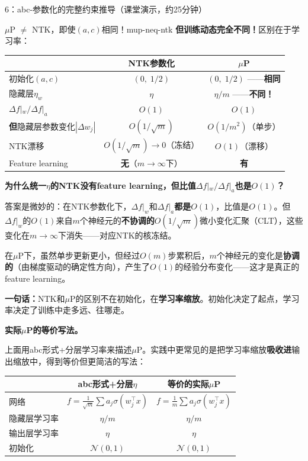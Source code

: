 \documentclass[11pt,a4paper]{article}
\newcommand{\cN}{\mathcal{N}}
\begin{document}
\begin{handcalc}{6：abc-参数化的完整约束推导（课堂演示，约25分钟）}
\begin{remark}{$\mu$P $\neq$ NTK，即使$(a,c)$相同！}{mup-neq-ntk}
\textbf{但训练动态完全不同！}区别在于学习率：

\begin{center}
\renewcommand{\arraystretch}{1.3}
\begin{tabular}{l|cc}
\toprule
& NTK参数化 & $\mu$P \\
\midrule
初始化$(a,c)$ & $(0,\;1/2)$ & $(0,\;1/2)$ ——\textbf{相同} \\
隐藏层$\eta_w$ & $\eta$ & $\eta/m$ ——\textbf{不同！} \\
$\Delta f|_w/\Delta f|_a$ & $O(1)$ & $O(1)$ \\
\textbf{但}隐藏层参数变化$|\Delta w_j|$ & $O(1/\sqrt{m})$ & $O(1/m^2)$（单步） \\
NTK漂移 & $O(1/\sqrt{m})\to 0$（冻结） & $O(1)$（漂移） \\
Feature learning & \textbf{无}（$m\to\infty$下） & \textbf{有} \\
\bottomrule
\end{tabular}
\end{center}

\textbf{为什么统一$\eta$的NTK没有feature learning，但比值$\Delta f|_w/\Delta f|_a$也是$O(1)$？}

答案是微妙的：在NTK参数化下，$\Delta f|_w$和$\Delta f|_a$\textbf{都是$O(1)$}，比值是$O(1)$。但$\Delta f|_w$的$O(1)$来自$m$个神经元的\textbf{不协调的}$O(1/\sqrt{m})$微小变化汇聚（CLT），这些变化在$m\to\infty$下消失——对应NTK的核冻结。

在$\mu$P下，虽然单步更新更小，但经过$O(m)$步累积后，$m$个神经元的变化是\textbf{协调的}（由梯度驱动的确定性方向），产生了$O(1)$的经验分布变化——这才是真正的feature learning。

\textbf{一句话：}NTK和$\mu$P的区别不在初始化，在\textbf{学习率缩放}。初始化决定了起点，学习率决定了训练中走多远、往哪走。
\end{remark}

\bigskip
\textbf{实际$\mu$P的等价写法。}

上面用abc形式+分层学习率来描述$\mu$P。实践中更常见的是把学习率缩放\textbf{吸收进}输出缩放中，得到等价但更简洁的写法：

\begin{center}
\renewcommand{\arraystretch}{1.3}
\begin{tabular}{l|cc}
\toprule
& abc形式+分层$\eta$ & 等价的实际$\mu$P \\
\midrule
网络 & $f=\frac{1}{\sqrt{m}}\sum a_j\sigma(w_j^\top x)$ & $f=\frac{1}{m}\sum a_j\sigma(w_j^\top x)$ \\
隐藏层学习率 & $\eta/m$ & $\eta/m$ \\
输出层学习率 & $\eta$ & $\eta$ \\
初始化 & $\cN(0,1)$ & $\cN(0,1)$ \\
\bottomrule
\end{tabular}
\end{center}


\end{handcalc}
\end{document}
